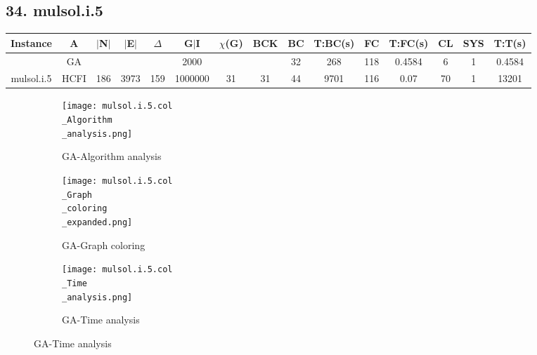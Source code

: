 \documentclass[10pt]{article}
\begin{document}
\subsection*{\hspace{0,9073976cm} 34. mulsol.i.5}
\begin{table}[H]
\centering
\begin{tabular}{|c|c|c|c|c|c|c|c|c|c|c|c|c|c|c|}
\hline
Instance& A &$|$N$|$ & $|$E$|$ & $\Delta$ & G$|$I & $\chi$(G) &BCK&BC & T:BC(s) & FC & T:FC(s) & CL & SYS & T:T(s) \\ \hline \hline

	&GA&       &                   &                     &    2000     &     \cellcolor{yellow} & {\cellcolor{yellow}}& {{\cellcolor{green}32}}
&268   &118       &0.4584                   &6                    &1          &0.4584        \\ \cline{2-2} \cline{6-6} \cline{9-15}
 \multirow{-2}{*}{mulsol.i.5} &HCFI   &\multirow{-2}{*}{186}   &\multirow{-2}{*}{3973}     &\multirow{-2}{*}{159}     &1000000     &\multirow{-2}{*}{\cellcolor{yellow}31}      & \multirow{-2}{*}{\cellcolor{yellow}31}    &{\cellcolor{green}44}     &9701         &116    &0.07         &70    & 1    &13201        \\ \hline 
\end{tabular}
\end{table}
\graphicspath{{./Core1/Solutions/GA/mulsol.i.5.col}}
\begin{figure}[H]
\begin{subfigure}{.33\textwidth}
  \centering
  \texttt{[image: mulsol.i.5.col\\\_Algorithm\\\_analysis.png]}
  \caption{GA-Algorithm analysis}
   \label{fig:subfig1}
\end{subfigure}%
\begin{subfigure}{.33\textwidth}
  \centering
  \texttt{[image: mulsol.i.5.col\\\_Graph\\\_coloring\\\_expanded.png]}
  \caption{GA-Graph coloring}
  \label{fig:subfig2}
\end{subfigure}
\begin{subfigure}{.33\textwidth}
  \centering
  \texttt{[image: mulsol.i.5.col\\\_Time\\\_analysis.png]}
  \caption{GA-Time analysis}
  \end{subfigure}
\end{figure}
\end{document}
